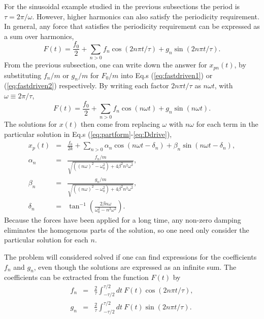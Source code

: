 For the sinusoidal example studied in the previous subsections the period is $\tau=2\pi/\omega$. However, higher harmonics can also satisfy the periodicity requirement. In general, any force that satisfies the periodicity requirement can be expressed as a sum over harmonics,
\begin{equation}
F(t)=\frac{f_0}{2}+\sum_{n>0} f_n\cos(2n\pi t/\tau)+g_n\sin(2n\pi t/\tau).
\end{equation}
From the previous subsection, one can write down the answer for $x_{pn}(t)$, by substituting $f_n/m$ or $g_n/m$ for $F_0/m$ into Eq.s (\ref{eq:fastdriven1}) or (\ref{eq:fastdriven2}) respectively. By writing each factor $2n\pi t/\tau$ as $n\omega t$, with $\omega\equiv 2\pi/\tau$,
\begin{equation}
\label{eq:fourierdef1}
F(t)=\frac{f_0}{2}+\sum_{n>0}f_n\cos(n\omega t)+g_n\sin(n\omega t).
\end{equation}
The solutions for $x(t)$ then come from replacing $\omega$ with $n\omega$ for each term in the particular solution in Eq.s (\ref{eq:partform}-\ref{eq:Ddrive}),
\begin{eqnarray}
x_p(t)&=&\frac{f_0}{2k}+\sum_{n>0} \alpha_n\cos(n\omega t-\delta_n)+\beta_n\sin(n\omega t-\delta_n),\\
\nonumber
\alpha_n&=&\frac{f_n/m}{\sqrt{((n\omega)^2-\omega_0^2)+4\beta^2n^2\omega^2}},\\
\nonumber
\beta_n&=&\frac{g_n/m}{\sqrt{((n\omega)^2-\omega_0^2)+4\beta^2n^2\omega^2}},\\
\nonumber
\delta_n&=&\tan^{-1}\left(\frac{2\beta n\omega}{\omega_0^2-n^2\omega^2}\right).
\end{eqnarray}
Because the forces have been applied for a long time, any non-zero damping eliminates the homogenous parts of the solution, so one need only consider the particular solution for each $n$.

The problem will considered solved if one can find expressions for the coefficients $f_n$ and $g_n$, even though the solutions are expressed as an infinite sum. The coefficients can be extracted from the function $F(t)$ by
\begin{eqnarray}
\label{eq:fourierdef2}
f_n&=&\frac{2}{\tau}\int_{-\tau/2}^{\tau/2} dt~F(t)\cos(2n\pi t/\tau),\\
\nonumber
g_n&=&\frac{2}{\tau}\int_{-\tau/2}^{\tau/2} dt~F(t)\sin(2n\pi t/\tau).
\end{eqnarray}

